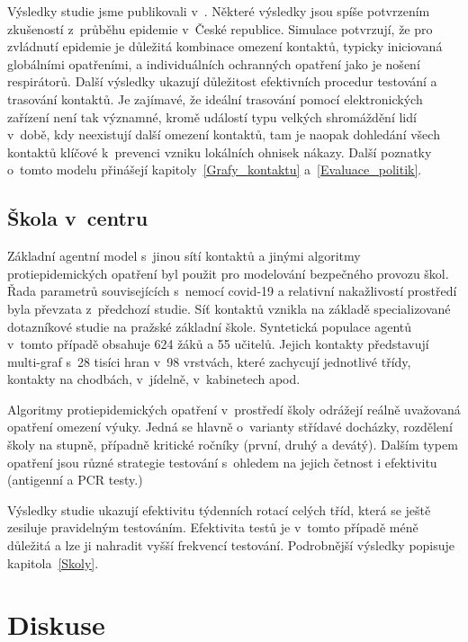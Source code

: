 Výsledky studie jsme publikovali v~\cite{M-techrep2021}. Některé výsledky jsou spíše potvrzením zkušeností z~průběhu epidemie v~České republice. Simulace potvrzují, že pro zvládnutí epidemie je důležitá kombinace omezení kontaktů, typicky iniciovaná globálními opatřeními, a individuálních ochranných opatření jako je nošení respirátorů. Další výsledky ukazují důležitost efektivních procedur testování a trasování kontaktů. Je zajímavé, že ideální trasování pomocí elektronických zařízení není tak významné, kromě událostí typu velkých shromáždění lidí v~době, kdy neexistují další omezení kontaktů, tam je naopak dohledání všech kontaktů klíčové k~prevenci vzniku lokálních ohnisek nákazy. Další poznatky o~tomto modelu přinášejí kapitoly~\ref{Grafy_kontaktu}
a~\ref{Evaluace_politik}.


\subsection*{Škola v~centru}

Základní agentní model s~jinou sítí kontaktů a jinými algoritmy protiepidemických opatření byl použit pro modelování bezpečného provozu škol. Řada parametrů souvisejících s~nemocí covid-19 a relativní nakažlivostí prostředí byla převzata z~před\-cho\-zí studie. Síť kontaktů vznikla na základě specializované dotazníkové studie na pražské základní škole. Syntetická populace agentů v~tomto případě obsahuje 624 žáků a 55 učitelů. Jejich kontakty představují multi-graf s~28 tisíci hran v~98 vrstvách, které zachycují jednotlivé třídy, kontakty na chodbách, v~jídelně, v~kabinetech apod. 

Algoritmy protiepidemických opatření v~prostředí školy odrážejí reálně uvažovaná opatření omezení výuky. Jedná se hlavně o~varianty střídavé docházky, rozdělení školy na stupně, případně kritické ročníky (první, druhý a devátý). Dalším typem opatření jsou různé strategie testování s~ohledem na jejich četnost i efektivitu (antigenní a PCR testy.)

Výsledky studie ukazují efektivitu týdenních rotací celých tříd, která se ještě zesiluje pravidelným testováním. Efektivita testů je v~tomto případě méně důležitá a lze ji nahradit vyšší frekvencí testování. Podrobnější výsledky popisuje kapitola~\ref{Skoly}.







\section*{Diskuse} 

